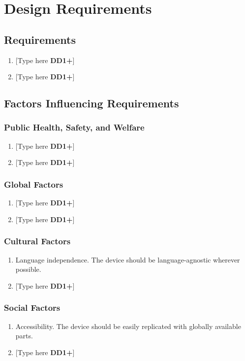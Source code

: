 \clearpage
\section{Design Requirements}
\subsection{Requirements}
\begin{enumerate}
    \item {[Type here \textbf{DD1+}]}
    \item {[Type here \textbf{DD1+}]}
\end{enumerate}

\clearpage

\subsection{Factors Influencing Requirements}
\subsubsection{Public Health, Safety, and Welfare}
\begin{enumerate}
    \item {[Type here \textbf{DD1+}]}
    \item {[Type here \textbf{DD1+}]}
\end{enumerate}

\subsubsection{Global Factors}
\begin{enumerate}
    \item {[Type here \textbf{DD1+}]}
    \item {[Type here \textbf{DD1+}]}
\end{enumerate}

\subsubsection{Cultural Factors}
\begin{enumerate}
    \item Language independence. The device should
          be language-agnostic wherever possible.
    \item {[Type here \textbf{DD1+}]}
\end{enumerate}

\subsubsection{Social Factors}
\begin{enumerate}
    \item Accessibility. The device should be
          easily replicated with globally available parts.
    \item {[Type here \textbf{DD1+}]}
\end{enumerate}

